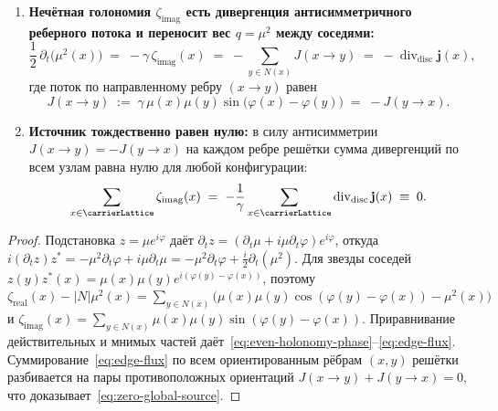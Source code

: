 \begin{theorem}
\begin{enumerate}[label=(\roman*)]
  имеют одинаковый знак ($1-\cos(+\Delta\varphi)=1-\cos(-\Delta\varphi)\ge 0$) и не сокращаются
  на симметричной звезде: именно $\delta\zeta_{\mathrm{real}}$ задаёт частоту плоской волны,
  равномерный ход фазы кипящего океана и одевающий ореол вихря на первой координационной сфере $S_1$.
\item \textbf{Нечётная голономия $\zeta_{\mathrm{imag}}$ есть дивергенция антисимметричного реберного потока и переносит вес $q=\mu^2$ между соседями:}
  \begin{equation}
  \label{eq:odd-holonomy-continuity}
    \frac{1}{2}\,\partial_t\bigl(\mu^2(x)\bigr)
    \;=\;
    -\gamma\,\zeta_{\mathrm{imag}}(x)
    \;=\;
    -\sum_{y\in N(x)} J(x\to y)
    \;=\;
    -\operatorname{div}_{\mathrm{disc}}\mathbf{j}(x),
  \end{equation}
  где поток по направленному ребру $(x\to y)$ равен
  \begin{equation}
  \label{eq:edge-flux}
    J(x\to y) \;:=\; \gamma\,\mu(x)\mu(y)\sin\bigl(\varphi(x)-\varphi(y)\bigr) \;=\; -J(y\to x).
  \end{equation}
\item \textbf{Источник тождественно равен нулю:} в силу антисимметрии $J(x\to y)=-J(y\to x)$
  на каждом ребре решётки сумма дивергенций по всем узлам равна нулю для любой конфигурации:
  \begin{equation}
  \label{eq:zero-global-source}
    \sum_{x\in\carrierLattice} \zeta_{\mathrm{imag}}(x)
    \;=\;
    -\frac{1}{\gamma}\sum_{x\in\carrierLattice}\operatorname{div}_{\mathrm{disc}}\mathbf{j}(x)
    \;\equiv\; 0.
  \end{equation}
\end{enumerate}
\end{theorem}

\begin{proof}
Подстановка $z=\mu e^{i\varphi}$ даёт $\partial_t z = (\partial_t\mu + i\mu\partial_t\varphi)e^{i\varphi}$,
откуда $i(\partial_t z)z^* = -\mu^2\partial_t\varphi + i\mu\partial_t\mu = -\mu^2\partial_t\varphi + \frac{i}{2}\partial_t(\mu^2)$.
Для звезды соседей $z(y)z^*(x) = \mu(x)\mu(y)e^{i(\varphi(y)-\varphi(x))}$, поэтому
$\zeta_{\mathrm{real}}(x)-|N|\mu^2(x) = \sum_{y\in N(x)}\bigl(\mu(x)\mu(y)\cos(\varphi(y)-\varphi(x))-\mu^2(x)\bigr)$
и $\zeta_{\mathrm{imag}}(x) = \sum_{y\in N(x)}\mu(x)\mu(y)\sin(\varphi(y)-\varphi(x))$.
Приравнивание действительных и мнимых частей даёт~\eqref{eq:even-holonomy-phase}--\eqref{eq:edge-flux}.
Суммирование~\eqref{eq:edge-flux} по всем ориентированным рёбрам $(x,y)$ решётки разбивается
на пары противоположных ориентаций $J(x\to y)+J(y\to x)=0$, что доказывает~\eqref{eq:zero-global-source}.
\end{proof}

